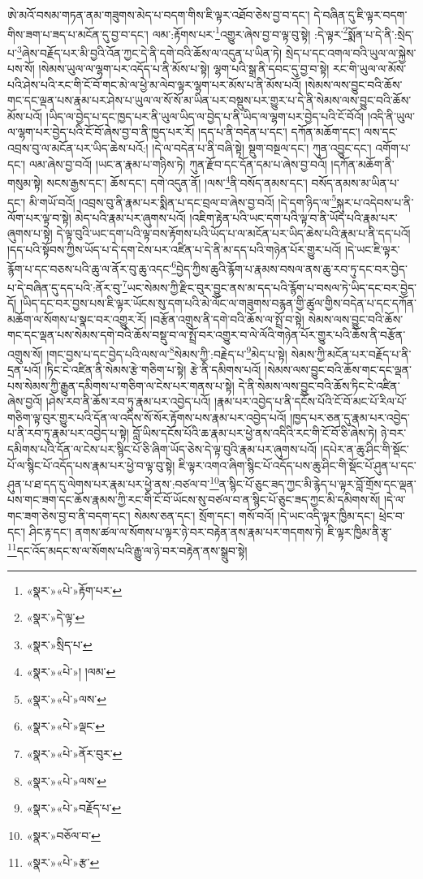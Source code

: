 ཨེ་མའོ་བསམ་གཏན་ནམ་གཟུགས་མེད་པ་བདག་གིས་ཇི་ལྟར་འཐོབ་ཅེས་བྱ་བ་དང་། དེ་བཞིན་དུ་ཇི་ལྟར་བདག་གིས་ཟག་པ་ཟད་པ་མངོན་དུ་བྱ་བ་དང་། ལམ་:རྟོགས་པར་\footnote{«སྣར་»«པེ་»རྟོག་པར་}འགྱུར་ཞེས་བྱ་བ་ལྟ་བུ་སྟེ། :དེ་ལྟར་\footnote{«སྣར་»དེ་ལྟ་}སྨོན་པ་དེ་ནི་:སྲེད་པ་\footnote{«སྣར་»སྲིད་པ་}ཞེས་བརྗོད་པར་མི་བྱའི་འོན་ཀྱང་དེ་ནི་དགེ་བའི་ཆོས་ལ་འདུན་པ་ཡིན་ཏེ། སྲེད་པ་དང་འགལ་བའི་ཡུལ་ལ་སྐྱེས་པས་སོ། །སེམས་ཡུལ་ལ་ལྷག་པར་འདོད་པ་ནི་མོས་པ་སྟེ། ལྷག་པའི་སྒྲ་ནི་དབང་དུ་བྱ་བ་སྟེ། རང་གི་ཡུལ་ལ་མོས་པའི་ཤེས་པའི་རང་གི་ངོ་བོ་གང་མེ་ལ་ཕྱེ་མ་ལེབ་ལྟར་ལྷག་པར་མོས་པ་ནི་མོས་པའོ། །སེམས་ལས་བྱུང་བའི་ཆོས་གང་དང་ལྡན་པས་རྣམ་པར་ཤེས་པ་ཡུལ་ལ་སོ་སོ་མ་ཡིན་པར་བསྡུས་པར་གྱུར་པ་དེ་ནི་སེམས་ལས་བྱུང་བའི་ཆོས་མོས་པའོ། །ཡིད་ལ་བྱེད་པ་དང་ཁྱད་པར་ནི་ཡུལ་ཡིད་ལ་བྱེད་པ་ནི་ཡིད་ལ་ལྷག་པར་བྱེད་པའི་ངོ་བོའོ། །འདི་ནི་ཡུལ་ལ་ལྷག་པར་བྱེད་པའི་ངོ་བོ་ཞེས་བྱ་བ་ནི་ཁྱད་པར་རོ། །དད་པ་ནི་བདེན་པ་དང་། དཀོན་མཆོག་དང་། ལས་དང་འབྲས་བུ་ལ་མངོན་པར་ཡིད་ཆེས་པའོ:། །དེ་ལ་བདེན་པ་ནི་བཞི་སྟེ། སྡུག་བསྔལ་དང་། ཀུན་འབྱུང་དང་། འགོག་པ་དང་། ལམ་ཞེས་བྱ་བའོ། །ཡང་ན་རྣམ་པ་གཉིས་ཏེ། ཀུན་རྫོབ་དང་དོན་དམ་པ་ཞེས་བྱ་བའོ། །དཀོན་མཆོག་ནི་གསུམ་སྟེ། སངས་རྒྱས་དང་། ཆོས་དང་། དགེ་འདུན་ནོ། །ལས་\footnote{«སྣར་»«པེ་»། །ལམ་}ནི་བསོད་ནམས་དང་། བསོད་ནམས་མ་ཡིན་པ་དང་། མི་གཡོ་བའོ། །འབྲས་བུ་ནི་རྣམ་པར་སྨིན་པ་དང་བྲལ་བ་ཞེས་བྱ་བའོ། །དེ་དག་ཉིད་ལ་\footnote{«སྣར་»«པེ་»ལས་}སྐུར་པ་འདེབས་པ་ནི་ལོག་པར་ལྟ་བ་སྟེ། མེད་པའི་རྣམ་པར་ཞུགས་པའོ། །འཇིག་རྟེན་པའི་ཡང་དག་པའི་ལྟ་བ་ནི་ཡོད་པའི་རྣམ་པར་ཞུགས་པ་སྟེ། དེ་ལྟ་བུའི་ཡང་དག་པའི་ལྟ་བས་རྟོགས་པའི་ཡོད་པ་ལ་མངོན་པར་ཡིད་ཆེས་པའི་རྣམ་པ་ནི་དད་པའོ། །དད་པའི་སྟོབས་ཀྱིས་ཡོད་པ་དེ་དག་ངེས་པར་འཛིན་པ་དེ་ནི་མ་དད་པའི་གཉེན་པོར་གྱུར་པའོ། །དེ་ཡང་ཇི་ལྟར་རྙོག་པ་དང་བཅས་པའི་ཆུ་ལ་ནོར་བུ་ཆུ་འདང་\footnote{«སྣར་»«པེ་»ལྡང་}བྱེད་ཀྱིས་ཆུའི་རྙོག་པ་རྣམས་བསལ་ནས་ཆུ་རབ་ཏུ་དང་བར་བྱེད་པ་དེ་བཞིན་དུ་དད་པའི་:ནོར་བུ་\footnote{«སྣར་»«པེ་»ནོར་བུར་}ཡང་སེམས་ཀྱི་རྫིང་བུར་བྱུང་ནས་མ་དད་པའི་རྙོག་པ་བསལ་ཏེ་ཡིད་དང་བར་བྱེད་དོ། །ཡིད་དང་བར་བྱས་པས་ཇི་ལྟར་ཡོངས་སུ་དག་པའི་མེ་ལོང་ལ་གཟུགས་བརྙན་གྱི་ཚུལ་གྱིས་བདེན་པ་དང་དཀོན་མཆོག་ལ་སོགས་པ་སྣང་བར་འགྱུར་རོ། །བརྩོན་འགྲུས་ནི་དགེ་བའི་ཆོས་ལ་སྤྲོ་བ་སྟེ། སེམས་ལས་བྱུང་བའི་ཆོས་གང་དང་ལྡན་པས་སེམས་དགེ་བའི་ཆོས་བསྡུ་བ་ལ་སྤྲོ་བར་འགྱུར་བ་ལེ་ལོའི་གཉེན་པོར་གྱུར་པའི་ཆོས་ནི་བརྩོན་འགྲུས་སོ། །གང་བྱས་པ་དང་བྱེད་པའི་ལས་ལ་\footnote{«སྣར་»«པེ་»ལས་}སེམས་ཀྱི་:བརྗེད་པ་\footnote{«སྣར་»«པེ་»བརྗོད་པ་}མེད་པ་སྟེ། སེམས་ཀྱི་མངོན་པར་བརྗོད་པ་ནི་དྲན་པའོ། །ཏིང་ངེ་འཛིན་ནི་སེམས་རྩེ་གཅིག་པ་སྟེ། རྩེ་ནི་དམིགས་པའོ། །སེམས་ལས་བྱུང་བའི་ཆོས་གང་དང་ལྡན་པས་སེམས་ཀྱི་རྒྱུན་དམིགས་པ་གཅིག་ལ་ངེས་པར་གནས་པ་སྟེ། དེ་ནི་སེམས་ལས་བྱུང་བའི་ཆོས་ཏིང་ངེ་འཛིན་ཞེས་བྱའོ། །ཤེས་རབ་ནི་ཆོས་རབ་ཏུ་རྣམ་པར་འབྱེད་པའོ། །རྣམ་པར་འབྱེད་པ་ནི་དངོས་པོའི་ངོ་བོ་མང་པོ་རིལ་པོ་གཅིག་ལྟ་བུར་གྱུར་པའི་དོན་ལ་འདིས་སོ་སོར་རྟོགས་པས་རྣམ་པར་འབྱེད་པའོ། །ཁྱད་པར་ཅན་དུ་རྣམ་པར་འབྱེད་པ་ནི་རབ་ཏུ་རྣམ་པར་འབྱེད་པ་སྟེ། བློ་ཡིས་དངོས་པོའི་ཆ་རྣམ་པར་ཕྱེ་ནས་འདིའི་རང་གི་ངོ་བོ་ཅི་ཞེས་ཏེ། ཉེ་བར་དམིགས་པའི་དོན་ལ་ངེས་པར་སྙིང་པོ་ཅི་ཞིག་ཡོད་ཅེས་དེ་ལྟ་བུའི་རྣམ་པར་ཞུགས་པའོ། །དཔེར་ན་ཆུ་ཤིང་གི་སྡོང་པོ་ལ་སྙིང་པོ་འདོད་པས་རྣམ་པར་ཕྱེ་བ་ལྟ་བུ་སྟེ། ཇི་ལྟར་འགའ་ཞིག་སྙིང་པོ་འདོད་པས་ཆུ་ཤིང་གི་སྡོང་པོ་ཤུན་པ་དང་ཤུན་པ་ཐ་དད་དུ་ལེགས་པར་རྣམ་པར་ཕྱེ་ནས་:བཙལ་བ་\footnote{«སྣར་»བཅོལ་བ་}ན་སྙིང་པོ་ཅུང་ཟད་ཀྱང་མི་རྙེད་པ་ལྟར་བློ་གྲོས་དང་ལྡན་པས་གང་ཟག་དང་ཆོས་རྣམས་ཀྱི་རང་གི་ངོ་བོ་ཡོངས་སུ་བཙལ་བ་ན་སྙིང་པོ་ཅུང་ཟད་ཀྱང་མི་དམིགས་སོ། །དེ་ལ་གང་ཟག་ཅེས་བྱ་བ་ནི་བདག་དང་། སེམས་ཅན་དང་། སྲོག་དང་། གསོ་བའོ། །དེ་ཡང་འདི་ལྟར་ཁྱིམ་དང་། ཕྲེང་བ་དང་། ཤིང་རྟ་དང་། ནགས་ཚལ་ལ་སོགས་པ་ལྟར་ཉེ་བར་བརྟེན་ནས་རྣམ་པར་གདགས་ཏེ། ཇི་ལྟར་ཁྱིམ་ནི་རྩྭ་\footnote{«སྣར་»«པེ་»རྩ་}དང་འོད་མདང་ས་ལ་སོགས་པའི་རྒྱུ་ལ་ཉེ་བར་བརྟེན་ནས་སྒྲུབ་སྟེ། 